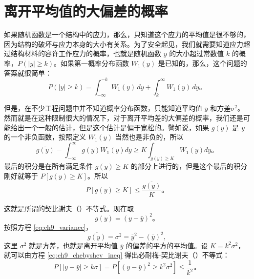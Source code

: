 \section{离开平均值的大偏差的概率}\label{ch9_sec6_probability}

如果随机函数是一个结构中的应力，那么，只知道这个应力的平均值是很不够的，因为结构的破坏与应力本身的大小有关系。为了安全起见，我们就需要知道应力超过结构材料的容许工作应力的概率，也就是随机函数 $ y $ 的大小超过常数值 $ k $ 的概率，$ P(|y| \geq k) $。如果第一概率分布函数 $ W_1(y) $ 是已知的，那么，这个问题的答案就很简单：
\begin{equation}\label{eq:ch9_excess_probability}
P(|y| \geq k) = \int_{-\infty}^{-k} W_1(y) \, dy + \int_k^\infty W_1(y) \, dy。
\end{equation}

但是，在不少工程问题中并不知道概率分布函数，只能知道平均值 $ \bar{y} $ 和方差$\sigma^2$。然而就是在这种限制很大的情况下，对于离开平均差的大偏差的概率，我们还是可能给出一个一般的估计，但是这个估计是偏于宽松的。譬如说，如果 $ g(y) $ 是 $ y $ 的一个非负函数，按照定义 $ W_1(y) $ 当然也是非负的，所以
\begin{equation}\label{eq:ch9_chebyshev_ineq_proof}
\overline{g(y)} = \int_{-\infty}^{\infty} g(y)W_1(y)dy \geq K \int_{g(y) \geq K} W_1(y)dy。
\end{equation}
最后的积分是在所有满足条件 $ g(y) \geq K $ 的部分上进行的，但是这个最后的积分刚好就等于 $ P[g(y) \geq K] $。所以
\begin{equation}\label{eq:ch9_chebyshev_ineq}
P[g(y) \geq K] \leq \frac{\overline{g(y)}}{K}。
\end{equation}

这就是所谓的契比谢夫（）不等式。现在取
\[
g(y) = (y - \bar{y})^2。
\]
按照方程 \eqref{eq:ch9_variance}，
\[
\overline{g(y)} = \sigma^2 = \bar{y}^2 - (\bar{y})^2,
\]
这里 $ \sigma^2 $ 就是方差，也就是离开平均值 $ \bar{y} $ 的偏差的平方的平均值。设 $ K = k^2\sigma^2 $，就可以由方程 \eqref{eq:ch9_chebyshev_ineq} 得出必耐梅-契比谢夫（）不等式：
\begin{equation}\label{eq:ch9_bienayme_chebyshev}
P[|y - \bar{y}| \geq k\sigma] = P[(y - \bar{y})^2 \geq k^2\sigma^2] \leq \frac{1}{k^2}。
\end{equation}

